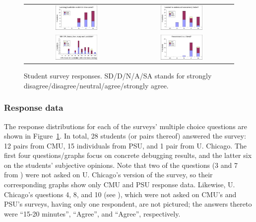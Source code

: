 \begin{figure}[p]
\begin{center}
\begin{tabular}{cc}
			\includegraphics[width=0.42\textwidth]{survey7.pdf} &
			\includegraphics[width=0.42\textwidth]{survey8.pdf} \\
			\includegraphics[width=0.42\textwidth]{survey9.pdf} &
			\includegraphics[width=0.42\textwidth]{survey10.pdf} \\
		\end{tabular}
	\end{center}
	\caption{Student survey responses.
	SD/D/N/A/SA stands for
	strongly disagree/\allowbreak{}disagree/\allowbreak{}neutral/\allowbreak{}agree/\allowbreak{}strongly agree.}
	\label{fig:survey}
\end{figure}

\subsubsection{Response data}

The response distributions for each of the surveys' multiple choice questions
are shown in Figure~\ref{fig:survey}.
In total, 28 students (or pairs thereof) answered the survey:
12 pairs from CMU, 15 individuals from PSU, and 1 pair from U. Chicago.
The first four questions/graphs focus on concrete debugging results,
and the latter six on the students' subjective opinions.
%
Note that two of the questions
(3 and 7 from \sect{\ref{sec:education-survey-pebbles}})
were not asked on U. Chicago's version of the survey,
so their corresponding graphs show only CMU and PSU response data.
Likewise, U. Chicago's questions 4, 8, and 10
(see \sect{\ref{sec:education-survey-pintos}}),
which were not asked on CMU's and PSU's surveys,
having only one respondent,
are not pictured;
the answers thereto were ``15-20 minutes'', ``Agree'', and ``Agree'', respectively.

